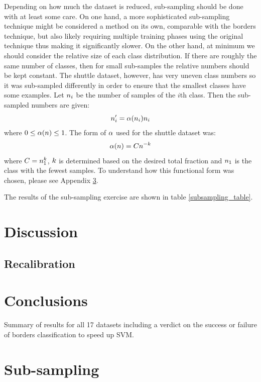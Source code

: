 \documentclass[11pt]{article}
\begin{document}
Depending on how much the dataset is reduced, sub-sampling should be done with at
least some care. 
On one hand, a more sophisticated sub-sampling technique might be considered a method on its own, 
comparable with the borders technique, but also likely requiring multiple training phases using the
original technique thus making it significantly slower.
On the other hand, at minimum we should consider the relative size of each class distribution.
If there are roughly the same number of classes, then for small sub-samples the relative
numbers should be kept constant.
The shuttle dataset, however, has very uneven class numbers so it was sub-sampled differently
in order to ensure that the smallest classes have some examples.
Let $n_i$ be the number of samples of the $i$th class.
Then the sub-sampled numbers are given:
\begin{equation}
	n^\prime_i = \alpha(n_i) n_i
\end{equation}
where $0 \le \alpha(n) \le 1$.
The form of $\alpha$ used for the shuttle dataset was:
\begin{equation}
	\alpha(n) = C n^{-k}
\end{equation}
where $C=n_1^k$, $k$ is determined based on the
desired total fraction and $n_1$ is the class with the fewest samples.
To understand how this functional form was chosen, please see Appendix \ref{shuttle_subsampling}.

The results of the sub-sampling exercise are shown in table \ref{subsampling_table}.

\section{Discussion}

\subsection{Recalibration}

\section{Conclusions}

\begin{table}
	\caption{Summary of results for all 17 datasets including a verdict on the success or failure of borders classification to speed up SVM.}
	\label{verdict}
	
\end{table}

\appendix

\section{Sub-sampling}
\label{shuttle_subsampling}




\end{document}
